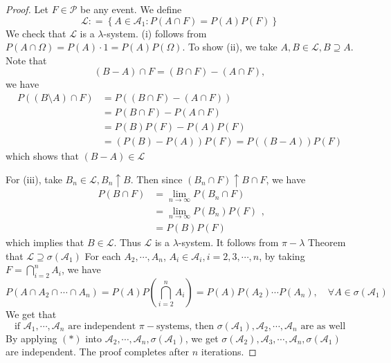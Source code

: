 \documentclass[../main.tex]{subfiles}
\begin{document}
\begin{proof}
    Let \( F\in \mathcal{P}\) be any event. We define \[
    \mathcal{L}: = \left\{ A\in \mathcal{A}_{1}: P\left( A\cap F \right)= P\left( A \right)P\left( F \right)    \right\}
    \]We check that \(  \mathcal{L}  \)   is a \(   \lambda   \)-system. (i) follows from  \(  P\left( A\cap  \Omega  \right)= P\left( A \right)\cdot 1= P\left( A \right)P\left(  \Omega  \right)      \). To show (ii), we take  \( A, B \in \mathcal{L}, B\supseteq A  \). Note that \[
    \left( B-A \right)\cap F=  \left( B\cap F \right)-\left( A\cap F \right),  
    \] we have \[
    \begin{aligned}
    P\left( \left( B\setminus A \right)\cap F  \right)&= P\left( \left( B\cap F \right)-\left( A\cap F \right)   \right)\\ 
     &=    P\left( B\cap F \right)-P\left( A\cap F \right)\\ 
      &=   P\left( B \right)P\left( F \right)-P\left( A \right)P\left( F \right)\\ 
       &= \left( P\left( B \right)-P\left( A \right)   \right)P\left( F \right)=  P\left( \left( B-A \right)  \right)P\left( F \right)       
    \end{aligned}
    \]   which shows that \(  \left( B-A \right)\in \mathcal{L}   \) 

    For (iii), take \(  B_{n}\in \mathcal{L}, B_{n}\uparrow B \). Then since \(  \left( B_{n}\cap F \right)\uparrow B\cap F   \), we have \[
    \begin{aligned}
    P\left( B\cap F \right)&= \lim_{n\to \infty} P\left( B_{n}\cap F \right)\\ 
     &= \lim_{n\to \infty}P\left( B_{n} \right)P\left( F \right)\\ 
      &=  P\left( B \right)P\left( F \right)      
    \end{aligned},
    \]which implies that \(  B \in \mathcal{L}  \). 
    Thus \(  \mathcal{L}  \) is a \(   \lambda   \)-system. It follows from \(   \pi- \lambda   \) Theorem that \(  \mathcal{L}\supseteq  \sigma \left( \mathcal{A}_{1} \right)   \)  For each \(  A_2,\cdots ,A_{n}  \), \(  A_{i}\in \mathcal{A}_{i},i= 2,3,\cdots ,n  \), by taking \(  F= \bigcap_{i= 2}^{n}A_{i}   \), we have \[
    P\left( A \cap A_2\cap \cdots \cap A_{n}\right)= P\left( A \right)P\left( \bigcap_{i= 2}^{n}A_{i}  \right)= P\left( A \right)P\left( A_2 \right)\cdots P\left( A_{n} \right),\quad \forall  A\in  \sigma \left( \mathcal{A}_{1} \right)       
    \]      We get that \[
\tag{*} \text{if }   \mathcal{A}_{1},\cdots ,\mathcal{A}_{n}  \text{ are independent }  \pi-\text{systems, then }  \sigma \left( \mathcal{A}_{1} \right),\mathcal{A}_{2},\cdots ,\mathcal{A}_{n}\text{ are as well}  
    \]  By applying \(  (*)  \) into \(  \mathcal{A}_{2},\cdots ,\mathcal{A}_{n},  \sigma \left( \mathcal{A}_{1} \right)   \), we get \(   \sigma \left( \mathcal{A}_{2} \right),\mathcal{A}_{3},\cdots ,\mathcal{A}_{n}, \sigma \left( \mathcal{A}_{1} \right)    \)    are independent. The proof completes after \(  n  \) iterations. 
\end{proof}
 
\end{document}
